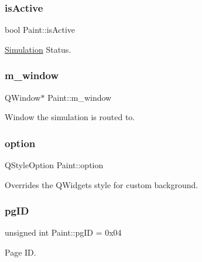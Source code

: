 \subsubsection{\texorpdfstring{isActive}{isActive}}
{\footnotesize\ttfamily bool Paint\+::is\+Active\hspace{0.3cm}{\ttfamily [private]}}



\mbox{\hyperlink{classSimulation}{Simulation}} Status. 

\mbox{\label{classPaint_a12c0d1f2f57bd3aea9388f42aa6434f8}} 
\subsubsection{\texorpdfstring{m\_window}{m\_window}}
{\footnotesize\ttfamily Q\+Window$\ast$ Paint\+::m\+\_\+window\hspace{0.3cm}{\ttfamily [private]}}



Window the simulation is routed to. 

\mbox{\label{classPaint_ac0f5a8dc0d272705bd7251867e8eabf2}} 
\subsubsection{\texorpdfstring{option}{option}}
{\footnotesize\ttfamily Q\+Style\+Option Paint\+::option\hspace{0.3cm}{\ttfamily [private]}}



Overrides the Q\+Widget\textquotesingle{}s style for custom background. 

\mbox{\label{classPaint_af6314388e667b01d9cd88e1d875d0449}} 
\subsubsection{\texorpdfstring{pgID}{pgID}}
{\footnotesize\ttfamily unsigned int Paint\+::pg\+ID = 0x04}



Page ID. 

\mbox{\label{classPaint_a3e7c98331cbf71478fa2090c5d387cb2}} 
